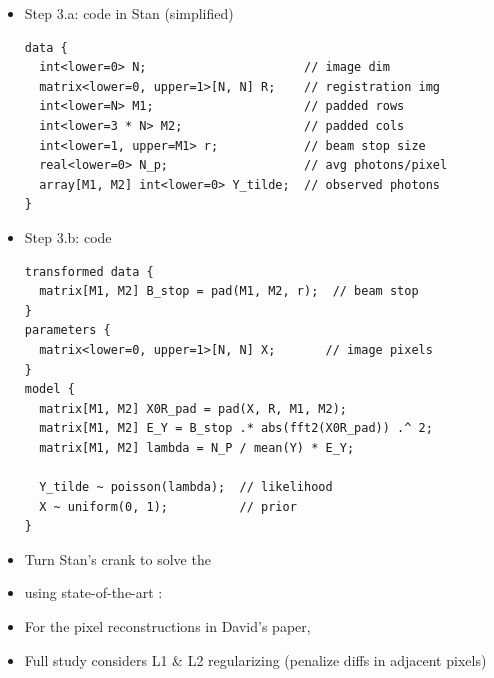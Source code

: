 \documentclass[9pt]{report}
\begin{document}
\begin{itemize}
\item Step 3.a: code  in Stan (simplified)
  \footnotesize
\begin{verbatim}
data {
  int<lower=0> N;                      // image dim
  matrix<lower=0, upper=1>[N, N] R;    // registration img
  int<lower=N> M1;                     // padded rows
  int<lower=3 * N> M2;                 // padded cols
  int<lower=1, upper=M1> r;            // beam stop size
  real<lower=0> N_p;                   // avg photons/pixel
  array[M1, M2] int<lower=0> Y_tilde;  // observed photons
}
\end{verbatim}
\end{itemize}
  
\begin{itemize}
\item \small Step 3.b: code 
  \footnotesize
\begin{verbatim}
transformed data {
  matrix[M1, M2] B_stop = pad(M1, M2, r);  // beam stop
}
parameters {
  matrix<lower=0, upper=1>[N, N] X;       // image pixels
}
model {
  matrix[M1, M2] X0R_pad = pad(X, R, M1, M2);
  matrix[M1, M2] E_Y = B_stop .* abs(fft2(X0R_pad)) .^ 2;
  matrix[M1, M2] lambda = N_P / mean(Y) * E_Y;

  Y_tilde ~ poisson(lambda);  // likelihood
  X ~ uniform(0, 1);          // prior
}
\end{verbatim}
\end{itemize}

\begin{itemize}
\item Turn Stan's crank to solve the 
\item using state-of-the-art : 
\item For the  pixel reconstructions in David's paper,
\item Full study considers L1 \& L2 regularizing  (penalize diffs in adjacent pixels)
\end{itemize}  
\end{document}
